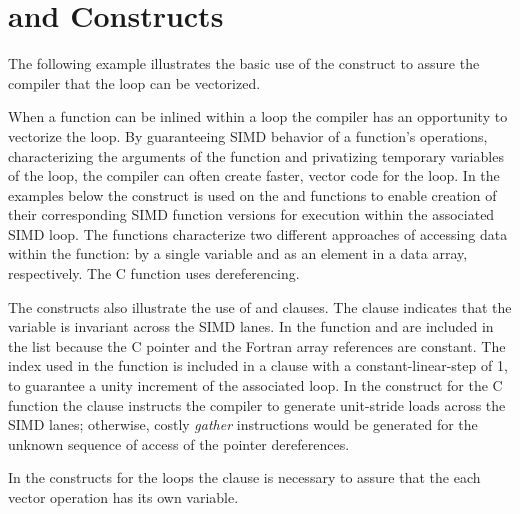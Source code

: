 \section{ and   Constructs}
\label{sec:SIMD}

The following example illustrates the basic use of the  construct 
to assure the compiler that the loop can be vectorized.



\clearpage
 

When a function can be inlined within a loop the compiler has an opportunity to 
vectorize the loop. By guaranteeing SIMD behavior of a function's operations, 
characterizing the arguments of the function and privatizing temporary 
variables of the loop, the compiler can often create faster, vector code for 
the loop. In the examples below the   construct is 
used on the  and  functions to enable creation of their 
corresponding SIMD function versions for execution within the associated SIMD 
loop. The functions characterize two different approaches of accessing data 
within the function: by a single variable and as an element in a data array, 
respectively. The  C function uses dereferencing.

The   constructs also illustrate the use of 
 and  clauses.  The  clause 
indicates that the variable  is invariant across the SIMD lanes. In 
the  function  and  are included in the  
list because the C pointer and the Fortran array references are constant.  The 
 index used in the  function is included in a  
clause with a constant-linear-step of 1, to guarantee a unity increment of the 
associated loop. In the   construct for the  
C function the   clause instructs the compiler to generate 
unit-stride loads across the SIMD lanes; otherwise,  costly \emph{gather} 
instructions would be generated for the unknown sequence of access of the 
pointer dereferences.

In the  constructs for the loops the  clause is 
necessary to assure that the each vector operation has its own  
variable.


